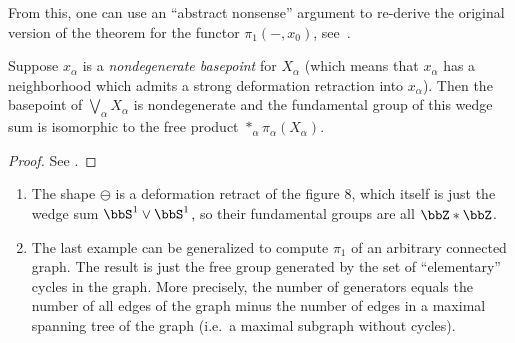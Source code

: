 From this, one can use an ``abstract nonsense'' argument to re-derive the original version of the theorem for the functor $\pi_1(-,x_0)$, see~\cite[\S 2.7]{May}.

\begin{cor}
    Suppose $x_\alpha$ is a \emph{nondegenerate basepoint} for $X_\alpha$ (which means that $x_\alpha$ has a neighborhood which admits a strong deformation retraction into $x_\alpha$). Then the basepoint of $\bigvee_{\alpha }X_\alpha$ is nondegenerate and the fundamental group of this wedge sum is isomorphic to the free product $\ast_{\alpha}\pi_\alpha(X_\alpha)$.
\end{cor}
\begin{proof}
    See \cite[Theorem 10.7]{LeeTop}.
\end{proof}

\begin{example}
\begin{enumerate}
    \item The shape $\ominus$ is a deformation retract of the figure 8, which itself is just the wedge sum $\bbS^1\vee \bbS^1$, so their fundamental groups are all $\bbZ\ast\bbZ$.
    \item The last example can be generalized to compute $\pi_1$ of an arbitrary connected graph. The result is just the free group generated by the set of ``elementary'' cycles in the graph. More precisely, the number of generators equals the number of all edges of the graph minus the number of edges in a maximal spanning tree of the graph (i.e.\ a maximal subgraph without cycles).
\end{enumerate}
\end{example}


